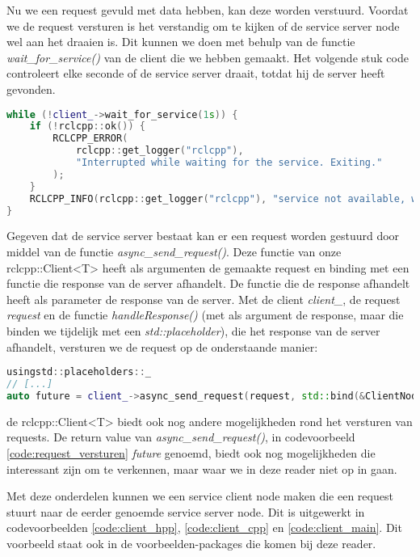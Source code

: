 Nu we een request gevuld met data hebben, kan deze worden verstuurd. Voordat we de request versturen is het verstandig om te kijken of de service server node wel aan het draaien is. Dit kunnen we doen met behulp van de functie \textit{wait\_for\_service()} van de client die we hebben gemaakt. Het volgende stuk code controleert elke seconde of de service server draait, totdat hij de server heeft gevonden. 
\begin{lstlisting}[language=C++, caption={}, firstnumber=0, label={}]
while (!client_->wait_for_service(1s)) {
    if (!rclcpp::ok()) {
        RCLCPP_ERROR(
            rclcpp::get_logger("rclcpp"), 
            "Interrupted while waiting for the service. Exiting."
        );
    }
    RCLCPP_INFO(rclcpp::get_logger("rclcpp"), "service not available, waiting again...");
}
\end{lstlisting}

Gegeven dat de service server bestaat kan er een request worden gestuurd door middel van de functie \textit{async\_send\_request()}. Deze functie van onze rclcpp::Client<T> heeft als argumenten de gemaakte request en binding met een functie die response van de server afhandelt. De functie die de response afhandelt heeft als parameter de response van de server. Met de client \textit{client\_}, de request \textit{request} en de functie \textit{handleResponse()} (met als argument de response, maar die binden we tijdelijk met een \textit{std::placeholder}), die het response van de server afhandelt, versturen we de request op de onderstaande manier:

\begin{lstlisting}[language=C++, caption={Een voorbeeld van het versturen van een request door een rclcpp::Client.}, firstnumber=0, label={code:request_versturen}]
usingstd::placeholders::_
// [...]
auto future = client_->async_send_request(request, std::bind(&ClientNode::handleResponse, this, _1));
\end{lstlisting}

\noindent de rclcpp::Client<T> biedt ook nog andere mogelijkheden rond het versturen van requests. De return value van \textit{async\_send\_request()}, in codevoorbeeld \ref{code:request_versturen} \textit{future} genoemd, biedt ook nog mogelijkheden die interessant zijn om te verkennen, maar waar we in deze reader niet op in gaan.

Met deze onderdelen kunnen we een service client node maken die een request stuurt naar de eerder genoemde service server node. Dit is uitgewerkt in codevoorbeelden \ref{code:client_hpp}, \ref{code:client_cpp} en \ref{code:client_main}. Dit voorbeeld staat ook in de voorbeelden-packages die komen bij deze reader. 

